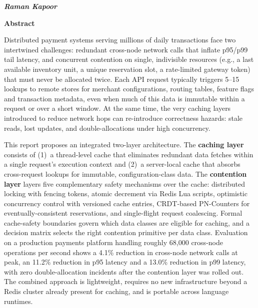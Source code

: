 \documentclass[12pt,a4paper,oneside]{report}
\begin{document}
\begin{flushright}
\textit{\textbf{Raman Kapoor}}
\end{flushright}
\clearpage

\thispagestyle{empty}
\begin{center}
{\Large\bf Abstract}
\end{center}
\noindent Distributed payment systems serving millions of daily transactions face two intertwined challenges: redundant cross-node network calls that inflate p95/p99 tail latency, and concurrent contention on single, indivisible resources (e.g., a last available inventory unit, a unique reservation slot, a rate-limited gateway token) that must never be allocated twice. Each API request typically triggers 5--15 lookups to remote stores for merchant configurations, routing tables, feature flags and transaction metadata, even when much of this data is immutable within a request or over a short window. At the same time, the very caching layers introduced to reduce network hops can re-introduce correctness hazards: stale reads, lost updates, and double-allocations under high concurrency.

This report proposes an integrated two-layer architecture. The \textbf{caching layer} consists of (1)~a thread-level cache that eliminates redundant data fetches within a single request's execution context and (2)~a server-local cache that absorbs cross-request lookups for immutable, configuration-class data. The \textbf{contention layer} layers five complementary safety mechanisms over the cache: distributed locking with fencing tokens, atomic decrement via Redis Lua scripts, optimistic concurrency control with versioned cache entries, CRDT-based PN-Counters for eventually-consistent reservations, and single-flight request coalescing. Formal cache-safety boundaries govern which data classes are eligible for caching, and a decision matrix selects the right contention primitive per data class. Evaluation on a production payments platform handling roughly 68{,}000 cross-node operations per second shows a 4.1\% reduction in cross-node network calls at peak, an 11.2\% reduction in p95 latency and a 13.0\% reduction in p99 latency, with zero double-allocation incidents after the contention layer was rolled out. The combined approach is lightweight, requires no new infrastructure beyond a Redis cluster already present for caching, and is portable across language runtimes.
\clearpage
\end{document}
